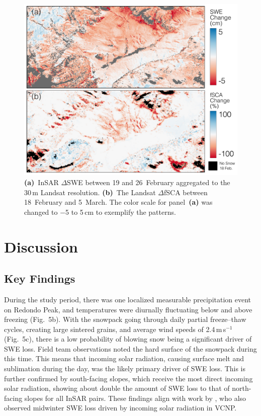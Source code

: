 \begin{figure}[t]
\centering
\includegraphics[width=14cm]{figures/ch3_figs/fig12.pdf}
\caption{\textbf{(a)}~InSAR $\Delta$SWE between 19 and 26~February aggregated to the 30\,m Landsat resolution. \textbf{(b)}~The Landsat $\Delta$fSCA between 18~February and 5~March. The color scale for panel~\textbf{(a)} was changed to $-$5 to 5\,cm to exemplify the patterns.}
\end{figure}


\hypertarget{ch4-discussion}{\section{Discussion}\label{ch4-discussion}}
\hypertarget{ch4-discussion-1}{\subsection{Key Findings}\label{ch4-discussion-1}}



During the study period, there was one localized measurable precipitation event on Redondo Peak, and temperatures were diurnally fluctuating below and above freezing (Fig.~5b). With the snowpack going through daily partial freeze--thaw cycles, creating large sintered grains, and average wind speeds of 2.4\,m\,s$^{-1}$ (Fig.~5c), there is a low probability of blowing snow being a significant driver of SWE loss. Field team observations noted the hard surface of the snowpack during this time. This means that incoming solar radiation, causing surface melt and sublimation during the day, was the likely primary driver of SWE loss. This is further confirmed by south-facing slopes, which receive the most direct incoming solar radiation, showing about double the amount of SWE loss to that of north-facing slopes for all InSAR pairs. These findings align with work by \citet{musselmanEffectsVegetationSnow2008}, who also observed midwinter SWE loss driven by incoming solar radiation in VCNP.

